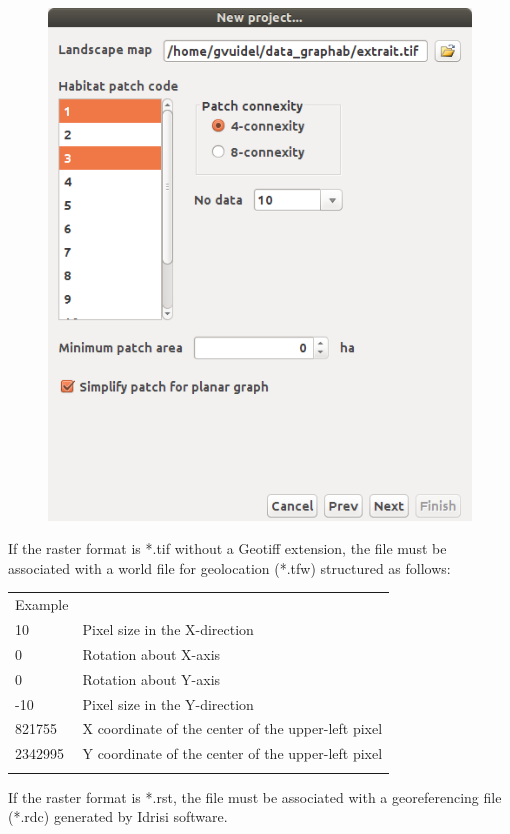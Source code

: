 \documentclass{article}
\begin{document}
\begin{figure}[H]
	\includegraphics[scale=0.5]{img/manual-en_img3.png}
\end{figure}

If the raster format is *.tif without a Geotiff extension, the file must be associated with a world file for geolocation (*.tfw) structured as follows:

\begin{table}[H]

\begin{tabular}{|m{3.552cm}|m{7.0800004cm}}
\hhline{-~}
Example &
\\\hhline{-~}
10 & Pixel size in the X-direction\\
0 & Rotation about X-axis \\
0 & Rotation about Y-axis \\
{}-10 & Pixel size in the Y-direction \\
821755 & X coordinate of the center of the upper-left pixel\\
2342995 & Y coordinate of the center of the upper-left pixel\\\hhline{-~}
\end{tabular}
\end{table}
If the raster format is *.rst, the file must be associated with a georeferencing file (*.rdc) generated by Idrisi software.  
\end{document}
